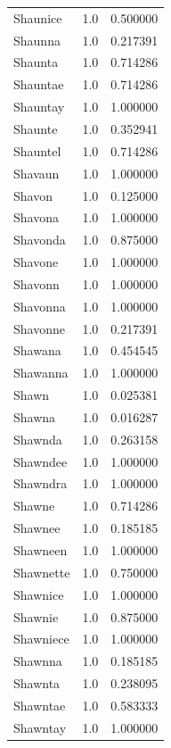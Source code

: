 \documentclass[
  letterpaper,
  DIV=11,
  numbers=noendperiod]{scrreprt}
\begin{document}
\begin{tabular}{lrr}
Shaunice        &   1.0 &   0.500000 \\
Shaunna         &   1.0 &   0.217391 \\
Shaunta         &   1.0 &   0.714286 \\
Shauntae        &   1.0 &   0.714286 \\
Shauntay        &   1.0 &   1.000000 \\
Shaunte         &   1.0 &   0.352941 \\
Shauntel        &   1.0 &   0.714286 \\
Shavaun         &   1.0 &   1.000000 \\
Shavon          &   1.0 &   0.125000 \\
Shavona         &   1.0 &   1.000000 \\
Shavonda        &   1.0 &   0.875000 \\
Shavone         &   1.0 &   1.000000 \\
Shavonn         &   1.0 &   1.000000 \\
Shavonna        &   1.0 &   1.000000 \\
Shavonne        &   1.0 &   0.217391 \\
Shawana         &   1.0 &   0.454545 \\
Shawanna        &   1.0 &   1.000000 \\
Shawn           &   1.0 &   0.025381 \\
Shawna          &   1.0 &   0.016287 \\
Shawnda         &   1.0 &   0.263158 \\
Shawndee        &   1.0 &   1.000000 \\
Shawndra        &   1.0 &   1.000000 \\
Shawne          &   1.0 &   0.714286 \\
Shawnee         &   1.0 &   0.185185 \\
Shawneen        &   1.0 &   1.000000 \\
Shawnette       &   1.0 &   0.750000 \\
Shawnice        &   1.0 &   1.000000 \\
Shawnie         &   1.0 &   0.875000 \\
Shawniece       &   1.0 &   1.000000 \\
Shawnna         &   1.0 &   0.185185 \\
Shawnta         &   1.0 &   0.238095 \\
Shawntae        &   1.0 &   0.583333 \\
Shawntay        &   1.0 &   1.000000 \\

\end{tabular}
\end{document}
